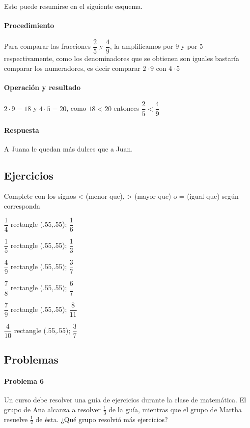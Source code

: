 \documentclass[10pt,twoside]{article}
\begin{document}
Esto puede resumirse en el siguiente esquema.
\paragraph*{Procedimiento}
Para comparar las fracciones $\dfrac{2}{5}$ y $\dfrac{4}{9}$, la amplificamos por 9 y por 5 respectivamente, como los denominadores que se obtienen son iguales bastar\'{i}a comparar los numeradores, es decir comparar $2\cdot 9$ con $4\cdot 5$
\paragraph*{Operaci\'{o}n y resultado}
$2\cdot 9=18$ y $4\cdot 5=20$, como $18<20$ entonces $\dfrac{2}{5}<\dfrac{4}{9}$
\paragraph*{Respuesta}
A Juana le quedan m\'{a}s dulces que a Juan.
\subsection*{Ejercicios}
Complete con los signos < (menor que), > (mayor que) o = (igual que) según corresponda
\begin{itemize}
\begin{multicols}{3}
\item $\dfrac{1}{4}$ \tikz \draw rectangle (.55,.55); $\dfrac{1}{6}$
\item $\dfrac{1}{5}$ \tikz \draw rectangle (.55,.55); $\dfrac{1}{3}$
\item $\dfrac{4}{9}$ \tikz \draw rectangle (.55,.55); $\dfrac{3}{7}$
\item $\dfrac{7}{8}$ \tikz \draw rectangle (.55,.55); $\dfrac{6}{7}$
\item $\dfrac{7}{9}$ \tikz \draw rectangle (.55,.55); $\dfrac{8}{11}$ 
\item $\dfrac{4}{10}$ \tikz \draw rectangle (.55,.55); $\dfrac{3}{7}$
\end{multicols}
\end{itemize}
\subsection*{Problemas}
\paragraph*{Problema 6}
Un curso debe resolver una gu\'{i}a de ejercicios durante la clase de matem\'{a}tica. El grupo de Ana alcanza a resolver $\frac{1}{3}$ de la gu\'{i}a, mientras que el grupo de Martha resuelve $\frac{1}{2}$ de \'{e}sta. ¿Qu\'{e} grupo resolvi\'{o} m\'{a}s ejercicios?
\end{document}
